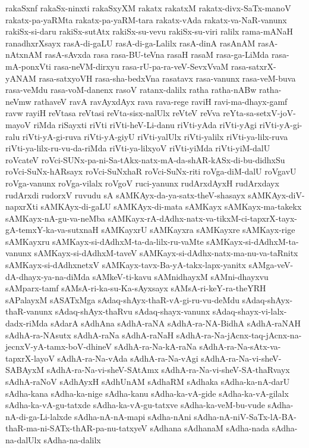 {rakaSxnf
rakaSx-ninxti
rakaSxyXM
rakatx
rakatxM
rakatx-divx-SaTx-manoV
rakatx-pa-yaRMta
rakatx-pa-yaRM-tara
rakatx-vAda
rakatx-va-NaR-vanunx
rakiSx-si-daru
rakiSx-sutAtx
rakiSx-su-vevu
rakiSx-su-viri
ralilx
rama-mANaH
ranadhxrXsayx
rasA-di-gaLU
rasA-di-ga-Lalilx
rasA-dinA
rasAnAM
rasA-nAtxnAM
rasA-sAvxda
rasa
rasa-BU-teVna
rasaH
rasaM
rasa-ga-LiMda
rasa-mA-ponxVti
rasa-neVM-dirxyu
rasa-rU-pa-ra-veV-SevxVvaM
rasa-satxrX-yANAM
rasa-satxyoVH
rasa-sha-bedxVna
rasatavx
rasa-vanunx
rasa-veM-buva
rasa-veMdu
rasa-voM-danenx
rasoV
ratanx-dalilx
ratha
ratha-nABw
ratha-neVmw
rathaveV
ravA
ravAyxdAyx
rava
rava-rege
raviH
ravi-ma-dhayx-gamf
ravw
rayiH
reVtasa
reVtasi
reVta-sisx-nalUlx
reVteV
reVva
reYta-sa-setxV-joV-mayoV
riMda
riSayxti
riVti
riVti-heV-Li-danu
riVti-yAda
riVti-yAgi
riVti-yA-gi-ralu
riVti-yA-gi-ruva
riVti-yA-giyU
riVti-yalUlx
riVti-yalilx
riVti-ya-lilx-ruva
riVti-ya-lilx-ru-vu-da-riMda
riVti-ya-lilxyoV
riVti-yiMda
riVti-yiM-dalU
roVcateV
roVci-SUNx-pa-ni-Sa-tAkx-natx-mA-da-shAR-kASx-di-bu-didhxSu
roVci-SuNx-hARsayx
roVci-SuNxhaR
roVci-SuNx-riti
roVga-diM-dalU
roVgavU
roVga-vanunx
roVga-vilalx
roVgoV
ruci-yanunx
rudArxdAyxH
rudArxdayx
rudArxdi
rudorxV
ruvudu
sA
sAMKAyx-da-ya-satx-theV-shasayx
sAMKAyx-diV-napxrXti
sAMKAyx-di-gaLU
sAMKAyx-di-mata
sAMKayx
sAMKayx-ma-takekx
sAMKayx-nA-gu-va-neMba
sAMKayx-rA-dAdhx-natx-va-tikxM-ci-tapxrX-tayx-gA-temxY-ka-va-sutxnaH
sAMKayxrU
sAMKayxra
sAMKayxre
sAMKayx-rige
sAMKayxru
sAMKayx-si-dAdhxM-ta-da-lilx-ru-vaMte
sAMKayx-si-dAdhxM-ta-vanunx
sAMKayx-si-dAdhxM-taveV
sAMKayx-si-dAdhx-natx-ma-nu-va-taRnitx
sAMKayx-si-dAdhxnetxV
sAMKayx-tavx-Ba-yA-takx-lapx-yanitx
sAMga-veV-dA-dhayx-ya-na-diMda
sAMkeV-ti-kavu
sAMnidhayxM
sAMni-dhayxvu
sAMparx-tamf
sAMsA-ri-ka-su-Ka-sAyxsayx
sAMsA-ri-keY-ra-theYRH
sAPalayxM
sASATxMga
sAdaq-shAyx-thaR-vA-gi-ru-vu-deMdu
sAdaq-shAyx-thaR-vanunx
sAdaq-shAyx-thaRvu
sAdaq-shayx-vanunx
sAdaq-shayx-vi-lalx-dadx-riMda
sAdarA
sAdhAna
sAdhA-raNA
sAdhA-ra-NA-BidhA
sAdhA-raNAH
sAdhA-ra-NAsutx
sAdhA-raNa
sAdhA-raNaH
sAdhA-ra-Na-jAcnx-taq-jAcnx-na-jecnxV-yA-tamx-boV-dhineV
sAdhA-ra-Na-kA-raNa
sAdhA-ra-Na-sAtx-va-tapxrX-layoV
sAdhA-ra-Na-vAda
sAdhA-ra-Na-vAgi
sAdhA-ra-Na-vi-sheV-SABAyxM
sAdhA-ra-Na-vi-sheV-SAtAmx
sAdhA-ra-Na-vi-sheV-SA-thaRvayx
sAdhA-raNoV
sAdhAyxH
sAdhUnAM
sAdhaRM
sAdhaka
sAdha-ka-nA-darU
sAdha-kana
sAdha-ka-nige
sAdha-kanu
sAdha-ka-vA-gide
sAdha-ka-vA-gilalx
sAdha-ka-vA-gu-tatxde
sAdha-ka-vA-gu-tatxve
sAdha-ka-veM-bu-vude
sAdha-nA-di-ga-Li-lalxde
sAdha-nA-nA-mapi
sAdha-nAni
sAdha-nA-niV-SaTx-lA-BA-thaR-ma-ni-SATx-thAR-pa-nu-tatxyeV
sAdhana
sAdhanaM
sAdha-nada
sAdha-na-dalUlx
sAdha-na-dalilx
}
